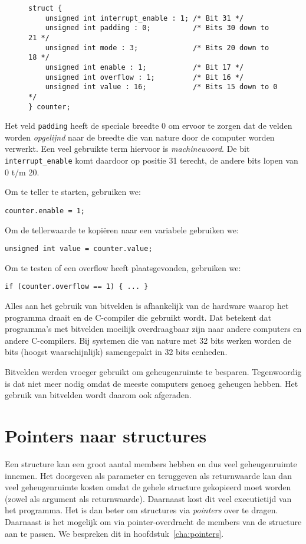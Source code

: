 \begin{figure}[!ht]
\begin{lstlisting}[caption=Voorbeeld van bitvelden.,label=cod:bitfields]
struct {
    unsigned int interrupt_enable : 1; /* Bit 31 */
    unsigned int padding : 0;          /* Bits 30 down to 21 */
    unsigned int mode : 3;             /* Bits 20 down to 18 */
    unsigned int enable : 1;           /* Bit 17 */
    unsigned int overflow : 1;         /* Bit 16 */
    unsigned int value : 16;           /* Bits 15 down to 0 */
} counter;
\end{lstlisting}
\end{figure}
Het veld \texttt{padding} heeft de speciale breedte 0 om ervoor te zorgen dat de velden worden \textsl{opgelijnd} naar de breedte die van nature door de computer worden verwerkt. Een veel gebruikte term hiervoor is \textsl{machinewoord}. De bit \texttt{interrupt\_enable} komt daardoor op positie 31 terecht, de andere bits lopen van 0 t/m 20.


Om te teller te starten, gebruiken we:

\hspace*{1em}\texttt{counter.enable = 1;}

Om de tellerwaarde te kopiëren naar een variabele gebruiken we:

\hspace*{1em}\texttt{unsigned int value = counter.value;}

Om te testen of een overflow heeft plaatsgevonden, gebruiken we:

\hspace*{1em}\texttt{if (counter.overflow == 1) \{ ... \} }

Alles aan het gebruik van bitvelden is afhankelijk van de hardware waarop het programma draait en de C-compiler die gebruikt wordt. Dat betekent dat programma's met bitvelden moeilijk overdraagbaar zijn naar andere computers en andere C-compilers. Bij systemen die van nature met 32 bits werken worden de bits (hoogst waarschijnlijk) samengepakt in 32 bits eenheden.

Bitvelden werden vroeger gebruikt om geheugenruimte te besparen. Tegenwoordig is dat niet meer nodig omdat de meeste computers genoeg geheugen hebben. Het gebruik van bitvelden wordt daarom ook afgeraden.

\section{Pointers naar structures}
Een structure kan een groot aantal members hebben en dus veel geheugenruimte innemen. Het doorgeven als parameter en teruggeven als returnwaarde kan dan veel geheugenruimte kosten omdat de gehele structure gekopieerd moet worden (zowel als argument als returnwaarde). Daarnaast kost dit veel executietijd van het programma. Het is dan beter om structures via \textsl{pointers} over te dragen. Daarnaast is het mogelijk om via pointer-overdracht de members van de structure aan te passen. We bespreken dit in hoofdstuk~\ref{cha:pointers}.
	
\basic
